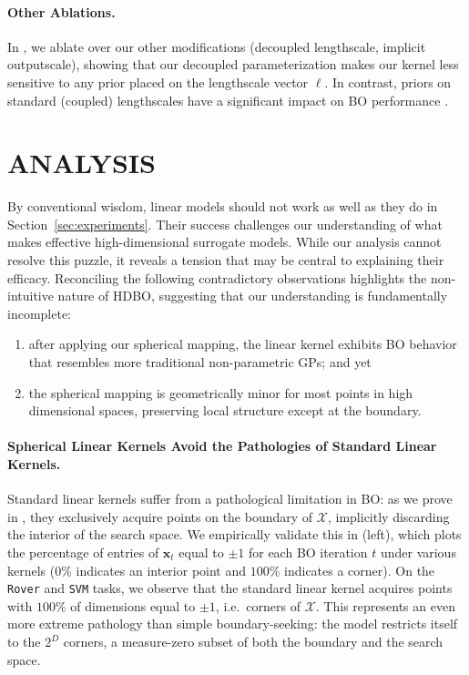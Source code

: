 \documentclass[twoside]{article}
\theoremstyle{plain}
\theoremstyle{definition}
\begin{document}
\paragraph{Other Ablations.}
In , we ablate over our other modifications (decoupled lengthscale, implicit outputscale), showing that our decoupled parameterization makes our kernel less sensitive to any prior placed on the lengthscale vector $\boldsymbol \ell$.
In contrast, priors on standard (coupled) lengthscales have a significant impact on BO performance \citep{hvarfner2024vanilla}.

\section{\bfseries\small ANALYSIS} \label{sec:analysis}
By conventional wisdom, linear models should not work as well as they do in Section~\ref{sec:experiments}.
Their success challenges our understanding of what makes effective high-dimensional surrogate models. While our analysis cannot resolve this puzzle, it reveals a tension that may be central to explaining their efficacy. Reconciling the following contradictory observations highlights the non-intuitive nature of HDBO, suggesting that our understanding is fundamentally incomplete:
\vspace*{-2ex}
\begin{enumerate}
\itemsep0em
    \item after applying our spherical mapping, the linear kernel exhibits BO behavior that resembles more traditional non-parametric GPs; and yet
    \item the spherical mapping is geometrically minor for most points in high dimensional spaces, preserving local structure except at the boundary.
\end{enumerate}


\paragraph{Spherical Linear Kernels Avoid the Pathologies of Standard Linear Kernels.}
Standard linear kernels suffer from a pathological limitation in BO: as we prove in , they exclusively acquire points on the boundary of $\mathcal{X}$, implicitly discarding the interior of the search space.
We empirically validate this in  (left), which plots the percentage of entries of $\mathbf{x}_t$ equal to $\pm 1$ for each BO iteration $t$ under various kernels ($0\%$ indicates an interior point and $100\%$ indicates a corner).
On the \texttt{Rover} and \texttt{SVM} tasks, we observe that the standard linear kernel acquires points with $100\%$ of dimensions equal to $\pm 1$, i.e.\ corners of $\mathcal X$.
This represents an even more extreme pathology than simple boundary-seeking: the model restricts itself to the $2^D$ corners, a measure-zero subset of both the boundary and the search space.
\end{document}
